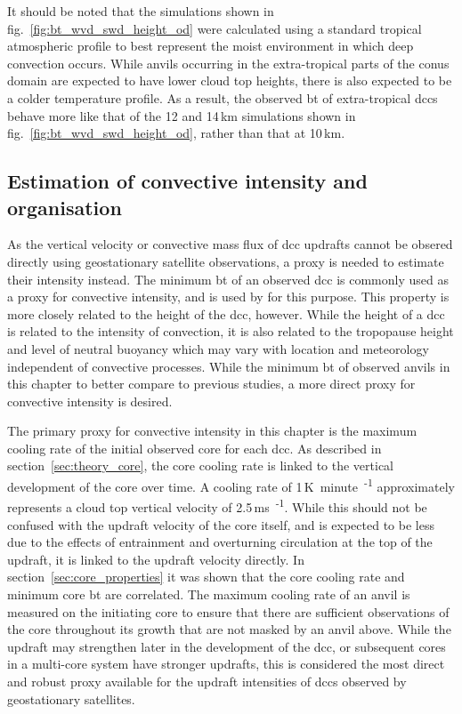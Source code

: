 It should be noted that the simulations shown in fig.~\ref{fig:bt_wvd_swd_height_od} were calculated using a standard tropical atmospheric profile to best represent the moist environment in which deep convection occurs.
While anvils occurring in the extra-tropical parts of the \acrshort{conus} domain are expected to have lower cloud top heights, there is also expected to be a colder temperature profile.
As a result, the observed \acrshort{bt} of extra-tropical \acrshort{dcc}s behave more like that of the 12 and 14\,\unit{km} simulations shown in fig.~\ref{fig:bt_wvd_swd_height_od}, rather than that at 10\,\unit{km}.


\subsection{Estimation of convective intensity and organisation} \label{sec:method_proxies}

As the vertical velocity or convective mass flux of \acrshort{dcc} updrafts cannot be obsered directly using geostationary satellite observations, a proxy is needed to estimate their intensity instead.
The minimum \acrshort{bt} of an observed \acrshort{dcc} is commonly used as a proxy for convective intensity, and is used by \citet{protopapadaki_upper_2017} for this purpose.
This property is more closely related to the height of the \acrshort{dcc}, however.
While the height of a \acrshort{dcc} is related to the intensity of convection, it is also related to the tropopause height and level of neutral buoyancy which may vary with location and meteorology independent of convective processes.
While the minimum \acrshort{bt} of observed anvils in this chapter to better compare to previous studies, a more direct proxy for convective intensity is desired.

The primary proxy for convective intensity in this chapter is the maximum cooling rate of the initial observed core for each \acrshort{dcc}.
As described in section~\ref{sec:theory_core}, the core cooling rate is linked to the vertical development of the core over time.
A cooling rate of 1\,\unit{K minute\textsuperscript{-1}} approximately represents a cloud top vertical velocity of 2.5\,\unit{ms\textsuperscript{-1}}.
While this should not be confused with the updraft velocity of the core itself, and is expected to be less due to the effects of entrainment and overturning circulation at the top of the updraft, it is linked to the updraft velocity directly.
In section~\ref{sec:core_properties} it was shown that the core cooling rate and minimum core \acrshort{bt} are correlated.
The maximum cooling rate of an anvil is measured on the initiating core to ensure that there are sufficient observations of the core throughout its growth that are not masked by an anvil above.
While the updraft may strengthen later in the development of the \acrshort{dcc}, or subsequent cores in a multi-core system have stronger updrafts, this is considered the most direct and robust proxy available for the updraft intensities of \acrshort{dcc}s observed by geostationary satellites.

